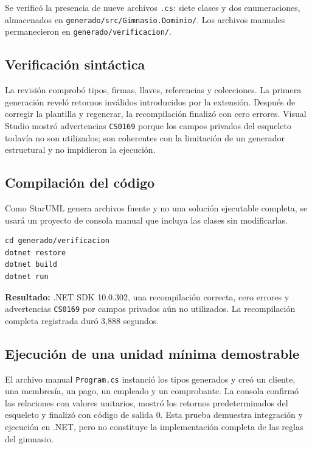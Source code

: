 \documentclass[12pt,a4paper]{article}
\begin{document}
Se verificó la presencia de nueve archivos \texttt{.cs}: siete clases y dos
enumeraciones, almacenados en \texttt{generado/src/Gimnasio.Dominio/}. Los
archivos manuales permanecieron en \texttt{generado/verificacion/}.

\subsection{Verificación sintáctica}

La revisión comprobó tipos, firmas, llaves, referencias y colecciones. La
primera generación reveló retornos inválidos introducidos por la extensión.
Después de corregir la plantilla y regenerar, la recompilación finalizó con
cero errores. Visual Studio mostró advertencias \texttt{CS0169} porque los
campos privados del esqueleto todavía no son utilizados; son coherentes con la
limitación de un generador estructural y no impidieron la ejecución.

\subsection{Compilación del código}

Como StarUML genera archivos fuente y no una solución ejecutable completa, se
usará un proyecto de consola manual que incluya las clases sin modificarlas.

\begin{lstlisting}[basicstyle=\ttfamily\footnotesize,frame=single,
caption={Comandos de verificación},label={lst:comandos-verificacion}]
cd generado/verificacion
dotnet restore
dotnet build
dotnet run
\end{lstlisting}

\textbf{Resultado:} .NET SDK 10.0.302, una recompilación correcta, cero
errores y advertencias \texttt{CS0169} por campos privados aún no utilizados.
La recompilación completa registrada duró 3,888 segundos.

\subsection{Ejecución de una unidad mínima demostrable}

El archivo manual \texttt{Program.cs} instanció los tipos generados y creó un
cliente, una membresía, un pago, un empleado y un comprobante. La consola
confirmó las relaciones con valores unitarios, mostró los retornos
predeterminados del esqueleto y finalizó con código de salida 0. Esta prueba
demuestra integración y ejecución en .NET, pero no constituye la
implementación completa de las reglas del gimnasio.
\end{document}
